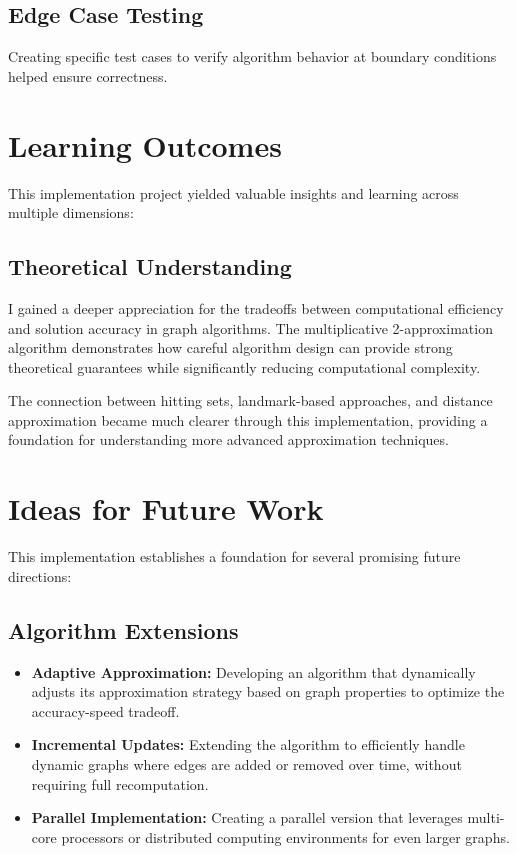 \documentclass[a4paper,11pt,oneside]{book}
\begin{document}
\subsection{Edge Case Testing}
Creating specific test cases to verify algorithm behavior at boundary conditions helped ensure correctness.

\section{Learning Outcomes}
This implementation project yielded valuable insights and learning across multiple dimensions:

\subsection{Theoretical Understanding}
I gained a deeper appreciation for the tradeoffs between computational efficiency and solution accuracy in graph algorithms. The multiplicative 2-approximation algorithm demonstrates how careful algorithm design can provide strong theoretical guarantees while significantly reducing computational complexity.

The connection between hitting sets, landmark-based approaches, and distance approximation became much clearer through this implementation, providing a foundation for understanding more advanced approximation techniques.

\section{Ideas for Future Work}
This implementation establishes a foundation for several promising future directions:

\subsection{Algorithm Extensions}
\begin{itemize}
    \item \textbf{Adaptive Approximation:} Developing an algorithm that dynamically adjusts its approximation strategy based on graph properties to optimize the accuracy-speed tradeoff.
    \item \textbf{Incremental Updates:} Extending the algorithm to efficiently handle dynamic graphs where edges are added or removed over time, without requiring full recomputation.
    \item \textbf{Parallel Implementation:} Creating a parallel version that leverages multi-core processors or distributed computing environments for even larger graphs.
\end{itemize}
\end{document}
